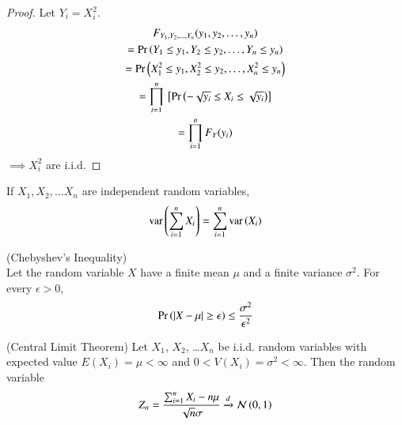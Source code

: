 \begin{proof}
Let $Y_i = X_i^2$.
\begin{multline}
    F_{Y_1,Y_2,\ldots,Y_n}(y_1,y_2,\ldots,y_n)
\\=\Pr\left(Y_1 \leq y_1,Y_2 \leq y_2,\ldots,Y_n \leq y_n\right)
     \\=\Pr\left(X_1^2 \leq y_1,X_2^2 \leq y_2,\ldots,X_n^2 \leq y_n\right)
    \\ = \prod_{i=1}^{n}{}\left[\Pr\left(-\sqrt{y_i} \leq X_i \leq \sqrt{y_i}\right)\right]
    \\= \prod_{i=1}^{n}F_Y(y_i) 
 \end{multline}
$\implies X_i^2$ are i.i.d.
\end{proof}
\begin{lemma} \label{conv/2/varsum}
    If $X_1, X_2, \ldots X_n$ are independent random variables,
    \begin{align}
        \text{var}\left( \sum_{i=1}^n X_i \right) = \sum_{i=1}^{n}\text{var}\left( X_i \right)
    \end{align}
\end{lemma}
\begin{lemma}\label{conv/2/lma4}
    (Chebyshev's Inequality)\\
Let the random variable $X$ have a finite mean $\mu$ and a finite variance $\sigma^2$. For every $\epsilon>0$, 
\begin{align}
    \Pr\left(\left\vert X - \mu\right\vert \geq \epsilon\right) \leq \frac{\sigma^2}{\epsilon^2}
\end{align}
\end{lemma}
\begin{lemma}\label{conv/2/lma2}
    (Central Limit Theorem)
Let $X_1$, $X_2$, \ldots $X_n$ be i.i.d. random variables with expected value $E(X_i)=\mu < \infty$  and $0 < V(X_i)=\sigma^2 < \infty$. Then the random variable 
\begin{align}
    Z_n 
    = \frac{\sum_{i=1}^n X_i - n\mu}{\sqrt{n}\sigma}
    \xrightarrow[]{d} \mathcal{N}\left({0}, {1} \right)
\end{align}
\end{lemma}
